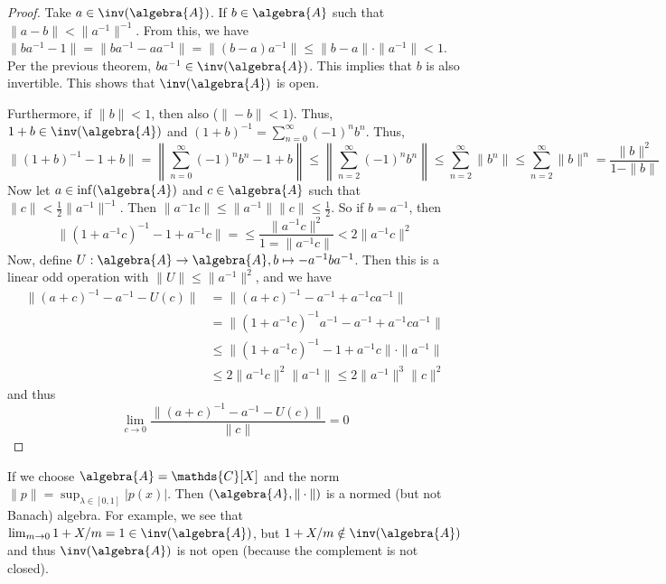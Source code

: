 \documentclass[a4paper]{article}
\begin{document}
\begin{proof}
	Take $a \in \inv(\algebra{A})$. If $b \in \algebra{A}$ such that $\|a - b\| < \|a^{-1}\|^{-1}$. From this, we have $\|b a^{-1} - 1\| = \| b a^{-1} - a a^{-1} \| = \|(b-a) a^{-1}\| \leq \|b - a\| \cdot \| a^{-1} \| < 1$. Per the previous theorem, $b a^{-1} \in \inv(\algebra{A})$. This implies that $b$ is also invertible. This shows that $\inv(\algebra{A})$ is open.

	Furthermore, if $\|b\| < 1$, then also ($\|-b\| < 1$). Thus, $1 + b \in \inv(\algebra{A})$ and $(1+b)^{-1} = \sum_{n = 0}^{\infty} (-1)^n b^n$. Thus,
	\begin{equation*}
		\| (1+b)^{-1} - 1 + b\| = \left\| \sum_{n = 0}^\infty (-1)^n b^n - 1 + b  \right\| \leq \left\| \sum_{n = 2}^\infty (-1)^n b^n \right\| \leq \sum_{n = 2}^{\infty} \|b^n\|  \leq \sum_{n = 2}^\infty \|b\|^n = \frac{\|b\|^2}{1 - \|b\|}
	\end{equation*}
	Now let $a \in \inf(\algebra{A})$ and $c \in \algebra{A}$ such that $\|c\| < \frac{1}{2} \|a^{-1}\|^{-1}$. Then $\|a^-1 c\| \leq \|a^{-1}\| \| c\| \leq \frac{1}{2}$. So if $b = a^{-1}$, then
	\begin{equation*}
		\|(1 + a^{-1}c)^{-1} - 1 + a^{-1} c\| = \leq \frac{\| a^{-1} c\|^2}{1 = \|a^{-1} c \|} < 2 \| a ^{-1} c \|^2
	\end{equation*}
	Now, define $U: \algebra{A} \to \algebra{A}, b \mapsto - a^{-1} b a^{-1}$. Then this is a linear odd operation with $\|U\| \leq \|a^{-1}\|^2$, and we have
	\begin{align*}
		\|(a + c)^{-1} - a^{-1} - U(c)\| & = \|(a+c)^{-1} - a^{-1} + a^{-1} c a^{-1}\|                  \\
		                                 & =  \|(1 + a^{-1}c)^{-1} a^{-1} - a^{-1} + a^{-1} c a^{-1}\|  \\
		                                 & \leq \|(1 + a^{-1}c)^{-1} -1 + a^{-1} c  \| \cdot \|a^{-1}\| \\
		                                 & \leq 2 \|a^{-1} c\|^2 \|a^{-1}\| \leq 2 \|a^{-1}\|^3 \|c\|^2
	\end{align*}
	and thus
	\begin{equation*}
		\lim_{c \to 0} \frac{\|(a + c)^{-1} - a^{-1} - U(c)\|}{\|c\|} = 0
	\end{equation*}
\end{proof}

\begin{example}
	If we choose $\algebra{A} = \mathds{C}[X]$ and the norm $\|p\| = \sup_{\lambda \in [0,1]} |p(x)|$.
	Then $(\algebra{A}, \|\cdot \|)$ is a normed (but not Banach) algebra.
	For example, we see that $\lim_{m \to 0} 1 + X/m = 1 \in \inv(\algebra{A})$, but $1 + X/m \notin \inv(\algebra{A})$ and thus $\inv(\algebra{A})$ is not open (because the complement is not closed).
\end{example}
\end{document}
